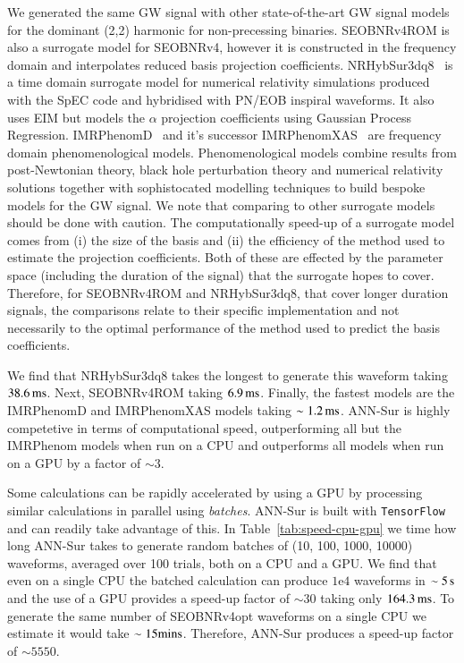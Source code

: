 \documentclass[aps,prd,reprint,superscriptaddress,preprintnumbers,showpacs,nofootinbib]{revtex4-1}
\newcommand{\expnumber}[2]{{#1}\mathrm{e}{#2}}
\begin{document}
We generated the same GW signal with other state-of-the-art GW signal models for
the dominant (2,2) harmonic for non-precessing binaries. SEOBNRv4ROM is also a
surrogate model for SEOBNRv4, however it is constructed in the frequency domain
and interpolates reduced basis projection coefficients.
NRHybSur3dq8~\cite{PhysRevD.99.064045} is a time domain surrogate model for
numerical relativity simulations produced with the SpEC code and hybridised with
PN/EOB inspiral waveforms. It also uses EIM but models the $\alpha$ projection
coefficients using Gaussian Process Regression.
IMRPhenomD~\cite{PhysRevD.93.044007} and it's successor
IMRPhenomXAS~\cite{Pratten2020SettingTC} are frequency domain phenomenological
models. Phenomenological models combine results from post-Newtonian theory,
black hole perturbation theory and numerical relativity solutions together with
sophistocated modelling techniques to build bespoke models for the GW signal. We
note that comparing to other surrogate models should be done with caution. The
computationally speed-up of a surrogate model comes from (i) the size of the
basis and (ii) the efficiency of the method used to estimate the projection
coefficients. Both of these are effected by the parameter space (including the
duration of the signal) that the surrogate hopes to cover. Therefore, for
SEOBNRv4ROM and NRHybSur3dq8, that cover longer duration signals, the
comparisons relate to their specific implementation and not necessarily to the
optimal performance of the method used to predict the basis coefficients.

We find that NRHybSur3dq8 takes the longest to generate this waveform taking $38.6
\, {\rm{ms}}$. Next, SEOBNRv4ROM taking $6.9 \, {\rm{ms}}$. Finally, the
fastest models are the IMRPhenomD and IMRPhenomXAS models taking $\sim 1.2 \,
{\rm{ms}}$. ANN-Sur is highly competetive in terms of
computational speed, outperforming all but the IMRPhenom models when run on a
CPU and outperforms all models when run on a GPU by a factor of $\sim 3$.

Some calculations can be rapidly accelerated by using a GPU by processing
similar calculations in parallel using \emph{batches}. ANN-Sur is built with
{\tt TensorFlow} and can readily take advantage of this. In
Table~\ref{tab:speed-cpu-gpu} we time how long ANN-Sur takes to generate random
batches of (10, 100, 1000, 10000) waveforms, averaged over 100 trials, both on a
CPU and a GPU. We find that even on a single CPU the batched calculation can
produce $\expnumber{1}{4}$ waveforms in $\sim 5 \, {\rm{s}}$ and the use of a
GPU provides a speed-up factor of $\sim 30$ taking only $164.3 \, {\rm{ms}}$. To
generate the same number of SEOBNRv4opt waveforms on a single CPU we estimate it
would take $\sim 15 {\rm{mins}}$. Therefore, ANN-Sur produces a speed-up factor
of $\sim 5550$.
\end{document}
